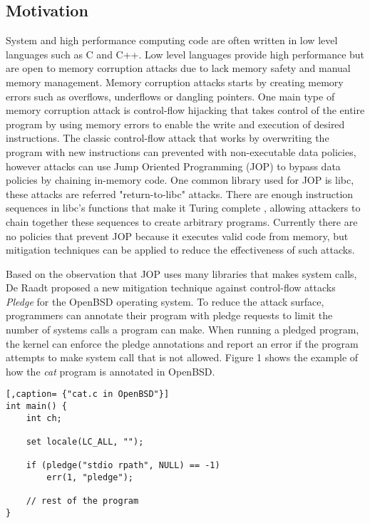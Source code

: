\subsection{Motivation}

System and high performance computing code are often written in low level languages such as C and C++. Low level languages provide high performance but are open to memory corruption attacks due to lack memory safety and manual memory management. Memory corruption attacks \cite{Szekeres_2013} starts by creating memory errors such as overflows, underflows or dangling pointers. One main type of memory corruption attack is control-flow hijacking that takes control of the entire program by using memory errors to enable the write and execution of desired instructions. The classic control-flow attack that works by overwriting the program with new instructions can prevented with non-executable data policies, however attacks can use Jump Oriented Programming (JOP) to bypass data policies by chaining in-memory code. One common library used for JOP is libc, these attacks are referred "return-to-libc" attacks. There are enough instruction sequences in libc's functions that make it Turing complete \cite{Tran_2011}, allowing attackers to chain together these sequences to create arbitrary programs. Currently there are no policies that prevent JOP because it executes valid code from memory, but mitigation techniques \cite{Li_2010, Pappas_2012, pledge} can be applied to reduce the effectiveness of such attacks.

Based on the observation that JOP uses many libraries that makes system calls, De Raadt proposed a new mitigation technique against control-flow attacks \textit{Pledge}\cite{pledge} for the OpenBSD operating system. To reduce the attack surface, programmers can annotate their program with pledge\cite{pledge2} requests to limit the number of systems calls a program can make. When running a pledged program, the kernel can enforce the pledge annotations and report an error if the program attempts to make system call that is not allowed. Figure 1 shows the example of how the \textit{cat} program is annotated in OpenBSD.

\begin{lstlisting}[,caption= {"cat.c in OpenBSD"}]
int main() {
    int ch;
    
    set locale(LC_ALL, "");
    
    if (pledge("stdio rpath", NULL) == -1)
        err(1, "pledge");
        
    // rest of the program
}
\end{lstlisting}